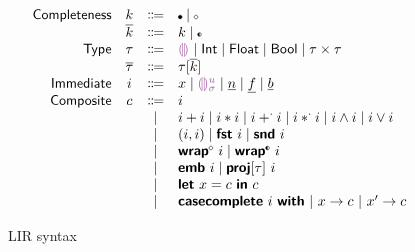 \documentclass[index.tex]{subfiles}
\begin{document}
\begin{figure}
  \[\begin{array}{rccl}
    \SortNComplete & \SortNCompleteVar & \Coloneqq & \CNC \mid \CNI \\
    \SortComplete  & \SortCompleteVar  & \Coloneqq & \SortNCompleteVar \mid \CII \\
    \SortTypCon    & \SortTypConVar    & \Coloneqq & \TCHole \mid \TCInt \mid \TCFloat \mid \TCBool 
                                                   \mid \TCPair{\SortTypConVar}{\SortTypConVar} \\
    \SortTyp       & \SortTypVar       & \Coloneqq & \TMk{\SortTypConVar}{\SortCompleteVar} \\
    \SortImm       & \SortImmVar       & \Coloneqq & x \mid \EEHole{\SortHoleIdVar}{\SortHoleEnvVar}
                                                   \mid \EIntLit \mid \EFloatLit \mid \EBoolLit \\
    \SortComp      & \SortCompVar      & \Coloneqq & \SortImmVar \\
                   &                   & \mid         & \EPlus{\SortImmVar}{\SortImmVar} 
                                                   \mid \ETimes{\SortImmVar}{\SortImmVar}
                                                   \mid \EFPlus{\SortImmVar}{\SortImmVar} 
                                                   \mid \EFTimes{\SortImmVar}{\SortImmVar}
                                                   \mid \EAnd{\SortImmVar}{\SortImmVar}
                                                   \mid \EOr{\SortImmVar}{\SortImmVar} \\
                   &                   & \mid         & \EPair{\SortImmVar}{\SortImmVar}
                                                   \mid \EProjL{\SortImmVar}
                                                   \mid \EProjR{\SortImmVar} \\
                   &                   & \mid         & \EWrapIntoNI{\SortImmVar}
                                                   \mid \EWrapIntoII{\SortImmVar} \\
                   &                   & \mid         & \EEmbed{\SortImmVar}
                                                   \mid \EProj{\SortImmVar}{\SortTypConVar} \\
                   &                   & \mid         & \ELet{x}{\SortCompVar} \EInn{\SortCompVar} \\
                   &                   & \mid         & \ECaseCompleteWith{\SortImmVar}
                                                     \ECaseCompleteBranch{x}{\SortCompVar}
                                                    ~\ECaseCompleteBranch{x'}{\SortCompVar}
  \end{array}\]
  \caption{LIR syntax}
  \label{lir-syntax}
\end{figure}
\end{document}
